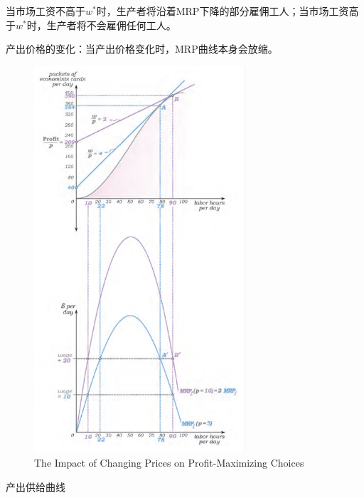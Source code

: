 \documentclass{article}
\begin{document}
当市场工资不高于$ w^* $时，生产者将沿着MRP下降的部分雇佣工人；当市场工资高于$ w^* $时，生产者将不会雇佣任何工人。

\hspace*{\fill}

产出价格的变化：当产出价格变化时，MRP曲线本身会放缩。

\begin{figure}[H] %
	\centering %
	\includegraphics[width=0.7\textwidth]{11_6} %
	\caption{The Impact of Changing Prices on Profit-Maximizing Choices} %
	\label{Fig.main7} %
\end{figure}

\hspace*{\fill}

产出供给曲线
\end{document}
